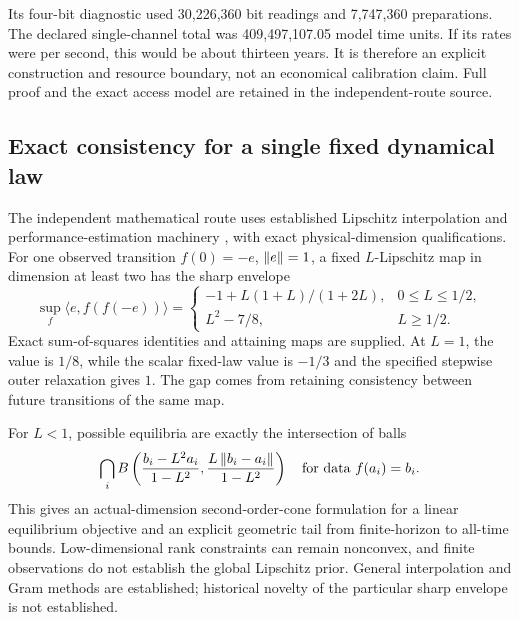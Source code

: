 Its four-bit diagnostic used 30,226,360 bit readings and 7,747,360
preparations. The declared single-channel total was
409,497,107.05 model time units. If its rates were per second, this would
be about thirteen years. It is therefore an explicit construction and
resource boundary, not an economical calibration claim. Full proof and
the exact access model are retained in the independent-route source.

\subsection{Exact consistency for a single fixed dynamical law}
The independent mathematical route uses established Lipschitz interpolation
and performance-estimation machinery \cite{ryu}, with exact physical-dimension
qualifications. For one observed transition $f(0)=-e$, $\left\lVert e\right\rVert=1$, a
fixed $L$-Lipschitz map in dimension at least two has the sharp envelope
\[
\sup_f\langle e,f(f(-e))\rangle=
\begin{cases}
-1+L(1+L)/(1+2L),&0\le L\le1/2,\\
L^2-7/8,&L\ge1/2.
\end{cases}
\]
Exact sum-of-squares identities and attaining maps are supplied. At $L=1$,
the value is $1/8$, while the scalar fixed-law value is $-1/3$ and the
specified stepwise outer relaxation gives $1$. The gap comes from retaining
consistency between future transitions of the same map.

For $L<1$, possible equilibria are exactly the intersection of balls
\[
\bigcap_i B\left(
\frac{b_i-L^2a_i}{1-L^2},
\frac{L\left\lVert b_i-a_i\right\rVert}{1-L^2}\right)
\quad\text{for data }f(a_i)=b_i.
\]
This gives an actual-dimension second-order-cone formulation for a linear
equilibrium objective and an explicit geometric tail from finite-horizon
to all-time bounds. Low-dimensional rank constraints can remain
nonconvex, and finite observations do not establish the global Lipschitz
prior. General interpolation and Gram methods are established; historical
novelty of the particular sharp envelope is not established.


